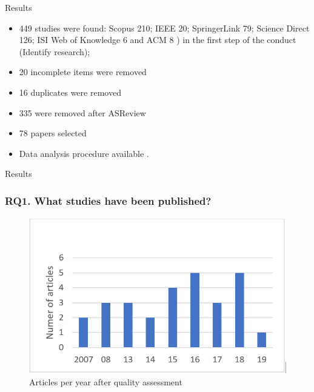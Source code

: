 \documentclass[10pt]{beamer}
\begin{document}
\begin{frame}[fragile]{Results}
  	\begin{itemize}
		\item 449 studies were found: Scopus 210; IEEE 20; SpringerLink	79; Science Direct 126; ISI Web of Knowledge 6 and ACM 8
) in the first step of the conduct (Identify research);
		\item 20 incomplete items were removed
		\item 16 duplicates were removed
		\item 335 were removed after ASReview
		\item 78 papers selected
		\item Data analysis procedure available \href{https://github.com/pesobreiro/dropoutPredFitness}{\color{red}{here}}.
	\end{itemize}
\end{frame}

\begin{frame}[fragile]{Results}
	\frametitle{RQ1. What studies have been published?}
	\begin{figure}
		\includegraphics[scale=0.5]{../img/articles_by_Year.png}
		\caption{Articles per year after quality assessment}
		\label{figure2}
	\end{figure}
\end{frame}
\end{document}
